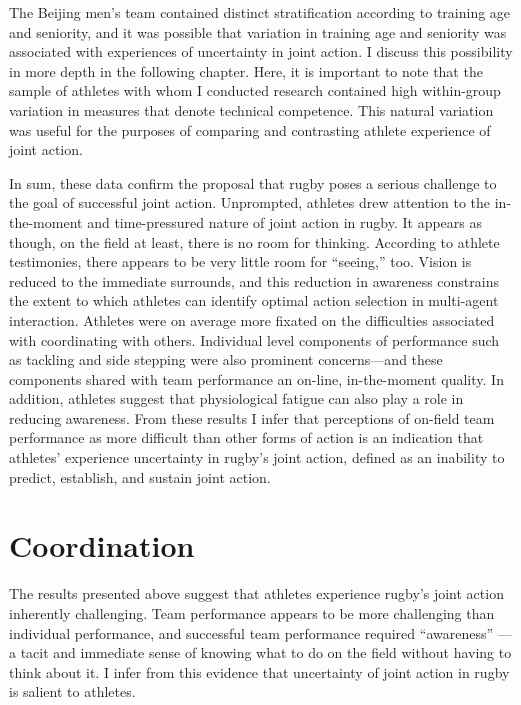 \begin{CJK}{UTF8}{gbsn}
The Beijing men's team contained distinct stratification according to training age and seniority, and it was possible that variation in training age and seniority was associated with experiences of uncertainty in joint action.  I discuss this possibility in more depth in the following chapter.  Here, it is important to note that the sample of athletes with whom I conducted research contained high within-group variation in measures that denote technical competence.  This natural variation was useful for the purposes of comparing and contrasting athlete experience of joint action.


In sum, these data confirm the proposal that rugby poses a serious challenge to the goal of successful joint action.  Unprompted, athletes drew attention to the in-the-moment and time-pressured nature of joint action in rugby.  It appears as though, on the field at least, there is no room for thinking.  According to athlete testimonies, there appears to be very little room for ``seeing,'' too.  Vision is reduced to the immediate surrounds, and this reduction in awareness constrains the extent to which athletes can identify optimal action selection in multi-agent interaction.  Athletes were on average more fixated on the difficulties associated with coordinating with others.  Individual level components of performance such as tackling and side stepping were also prominent concerns—and these components shared with team performance an on-line, in-the-moment quality.   In addition, athletes suggest that physiological fatigue can also play a role in reducing awareness.  From these results I infer that perceptions of on-field team performance as more difficult than other forms of action is an indication that athletes' experience uncertainty in rugby's joint action, defined as an inability to predict, establish, and sustain joint action.







\section{Coordination}
The results presented above suggest that athletes experience rugby's joint action inherently challenging.  Team performance appears to be more challenging than individual performance, and successful team performance required ``awareness'' — a tacit and immediate sense of knowing what to do on the field without having to think about it.  I infer from this evidence that uncertainty of joint action in rugby is salient to athletes.


\end{CJK}
